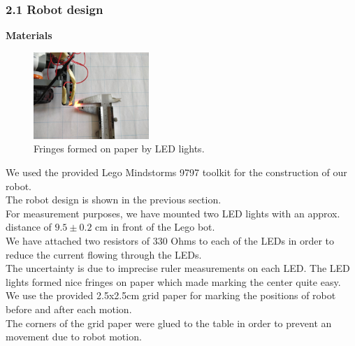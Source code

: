 \documentclass[11pt,a4paper,openright,twoside]{extreport}
\begin{document}
\subsubsection*{2.1 Robot design}
\textbf{Materials}
\begin{figure}
  \vspace{-50pt}
  \begin{center}
    \includegraphics[width=0.39\textwidth]{fringe.jpeg}
  \end{center}
  \vspace{-20pt}
  \caption{Fringes formed on paper by LED lights.}
\end{figure}

We used the provided Lego Mindstorms 9797 toolkit for the construction of our robot.\\
The robot design is shown in the previous section.\\
For measurement purposes, we have mounted two LED lights with an approx. distance of $9.5 \pm 0.2$ cm in front of the Lego bot. \\
We have attached two resistors of 330 Ohms to each of the LEDs in order to reduce the current flowing through the LEDs. \\
The uncertainty is due to imprecise ruler measurements on each LED. The LED lights formed nice fringes on paper which made marking the center quite easy.\\
We use the provided  2.5x2.5cm grid paper for marking the positions of robot before and after each motion.\\
The corners of the grid paper were glued to the table in order to prevent an movement due to robot motion. 
\end{document}
